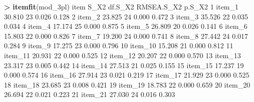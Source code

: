 \documentclass[
]{article}
\newenvironment{Shaded}{\begin{snugshade}}{\end{snugshade}}
\newcommand{\DecValTok}[1]{\textcolor[rgb]{0.00,0.00,0.81}{#1}}
\newcommand{\FloatTok}[1]{\textcolor[rgb]{0.00,0.00,0.81}{#1}}
\newcommand{\FunctionTok}[1]{\textcolor[rgb]{0.13,0.29,0.53}{\textbf{#1}}}
\newcommand{\NormalTok}[1]{#1}
\newcommand{\SpecialCharTok}[1]{\textcolor[rgb]{0.81,0.36,0.00}{\textbf{#1}}}
\begin{document}
\begin{Shaded}
\begin{Highlighting}[]
\SpecialCharTok{\textgreater{}} \FunctionTok{itemfit}\NormalTok{(mod\_3pl)}
\NormalTok{      item   S\_X2 df.S\_X2 RMSEA.S\_X2 p.S\_X2}
\DecValTok{1}\NormalTok{   item\_1 }\FloatTok{30.810}      \DecValTok{23}      \FloatTok{0.026}  \FloatTok{0.128}
\DecValTok{2}\NormalTok{   item\_2 }\FloatTok{23.825}      \DecValTok{24}      \FloatTok{0.000}  \FloatTok{0.472}
\DecValTok{3}\NormalTok{   item\_3 }\FloatTok{35.526}      \DecValTok{22}      \FloatTok{0.035}  \FloatTok{0.034}
\DecValTok{4}\NormalTok{   item\_4 }\FloatTok{17.174}      \DecValTok{25}      \FloatTok{0.000}  \FloatTok{0.875}
\DecValTok{5}\NormalTok{   item\_5 }\FloatTok{26.809}      \DecValTok{20}      \FloatTok{0.026}  \FloatTok{0.141}
\DecValTok{6}\NormalTok{   item\_6 }\FloatTok{15.803}      \DecValTok{22}      \FloatTok{0.000}  \FloatTok{0.826}
\DecValTok{7}\NormalTok{   item\_7 }\FloatTok{19.200}      \DecValTok{24}      \FloatTok{0.000}  \FloatTok{0.741}
\DecValTok{8}\NormalTok{   item\_8 }\FloatTok{27.442}      \DecValTok{24}      \FloatTok{0.017}  \FloatTok{0.284}
\DecValTok{9}\NormalTok{   item\_9 }\FloatTok{17.275}      \DecValTok{23}      \FloatTok{0.000}  \FloatTok{0.796}
\DecValTok{10}\NormalTok{ item\_10 }\FloatTok{15.208}      \DecValTok{21}      \FloatTok{0.000}  \FloatTok{0.812}
\DecValTok{11}\NormalTok{ item\_11 }\FloatTok{20.931}      \DecValTok{22}      \FloatTok{0.000}  \FloatTok{0.525}
\DecValTok{12}\NormalTok{ item\_12 }\FloatTok{20.207}      \DecValTok{22}      \FloatTok{0.000}  \FloatTok{0.570}
\DecValTok{13}\NormalTok{ item\_13 }\FloatTok{23.317}      \DecValTok{23}      \FloatTok{0.005}  \FloatTok{0.442}
\DecValTok{14}\NormalTok{ item\_14 }\FloatTok{27.513}      \DecValTok{21}      \FloatTok{0.025}  \FloatTok{0.155}
\DecValTok{15}\NormalTok{ item\_15 }\FloatTok{17.237}      \DecValTok{19}      \FloatTok{0.000}  \FloatTok{0.574}
\DecValTok{16}\NormalTok{ item\_16 }\FloatTok{27.914}      \DecValTok{23}      \FloatTok{0.021}  \FloatTok{0.219}
\DecValTok{17}\NormalTok{ item\_17 }\FloatTok{21.929}      \DecValTok{23}      \FloatTok{0.000}  \FloatTok{0.525}
\DecValTok{18}\NormalTok{ item\_18 }\FloatTok{23.685}      \DecValTok{23}      \FloatTok{0.008}  \FloatTok{0.421}
\DecValTok{19}\NormalTok{ item\_19 }\FloatTok{18.783}      \DecValTok{22}      \FloatTok{0.000}  \FloatTok{0.659}
\DecValTok{20}\NormalTok{ item\_20 }\FloatTok{26.694}      \DecValTok{22}      \FloatTok{0.021}  \FloatTok{0.223}
\DecValTok{21}\NormalTok{ item\_21 }\FloatTok{27.030}      \DecValTok{24}      \FloatTok{0.016}  \FloatTok{0.303}

\end{Highlighting}
\end{Shaded}
\end{document}

